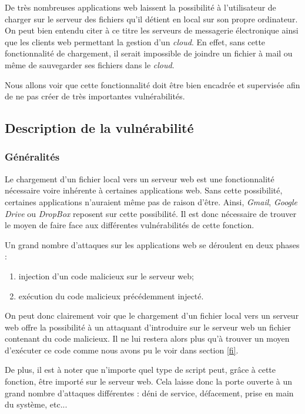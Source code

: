 De très nombreuses applications web laissent la possibilité à l'utilisateur de charger sur le serveur des fichiers qu'il détient en local sur son propre ordinateur. On peut bien entendu citer à ce titre les serveurs de messagerie électronique ainsi que les clients web permettant la gestion d'un \textit{cloud}. En effet, sans cette fonctionnalité de chargement, il serait impossible de joindre un fichier à mail ou même de sauvegarder ses fichiers dans le \textit{cloud}. 

Nous allons voir que cette fonctionnalité doit être bien encadrée et supervisée afin de ne pas créer de très importantes vulnérabilités.

\subsection{Description de la vulnérabilité}

\subsubsection{Généralités}

Le chargement d'un fichier local vers un serveur web est une fonctionnalité nécessaire voire inhérente à certaines applications web. Sans cette possibilité, certaines applications n'auraient même pas de raison d'être. Ainsi, \textit{Gmail}, \textit{Google Drive} ou \textit{DropBox} reposent sur cette possibilité. Il est donc nécessaire de trouver le moyen de faire face aux différentes vulnérabilités de cette fonction.

Un grand nombre d'attaques sur les applications web se déroulent en deux phases :
\begin{enumerate}
\item injection d'un code malicieux sur le serveur web;
\item exécution du code malicieux précédemment injecté.
\end{enumerate} 
On peut donc clairement voir que le chargement d'un fichier local vers un serveur web offre la possibilité à un attaquant d'introduire sur le serveur web un fichier contenant du code malicieux. Il ne lui restera alors plus qu'à trouver un moyen d'exécuter ce code comme nous avons pu le voir dans section \ref{fi}.

De plus, il est à noter que n'importe quel type de script peut, grâce à cette fonction, être importé sur le serveur web. Cela laisse donc la porte ouverte à un grand nombre d'attaques différentes : déni de service, défacement, prise en main du système, etc...

